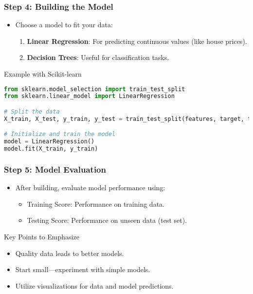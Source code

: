 \documentclass[aspectratio=169]{beamer}
\begin{document}
\begin{frame}[fragile]
    \frametitle{Step 4: Building the Model}
    \begin{itemize}
        \item Choose a model to fit your data:
            \begin{enumerate}
                \item \textbf{Linear Regression}: For predicting continuous values (like house prices).
                \item \textbf{Decision Trees}: Useful for classification tasks.
            \end{enumerate}
    \end{itemize}
    \begin{block}{Example with Scikit-learn}
    \begin{lstlisting}[language=Python]
from sklearn.model_selection import train_test_split
from sklearn.linear_model import LinearRegression

# Split the data
X_train, X_test, y_train, y_test = train_test_split(features, target, test_size=0.2, random_state=42)

# Initialize and train the model
model = LinearRegression()
model.fit(X_train, y_train)
    \end{lstlisting}
    \end{block}
\end{frame}

\begin{frame}
    \frametitle{Step 5: Model Evaluation}
    \begin{itemize}
        \item After building, evaluate model performance using:
            \begin{itemize}
                \item Training Score: Performance on training data.
                \item Testing Score: Performance on unseen data (test set).
            \end{itemize}
    \end{itemize}
    \begin{block}{Key Points to Emphasize}
        \begin{itemize}
            \item Quality data leads to better models.
            \item Start small—experiment with simple models.
            \item Utilize visualizations for data and model predictions.
        \end{itemize}
    \end{block}
\end{frame}
\end{document}
